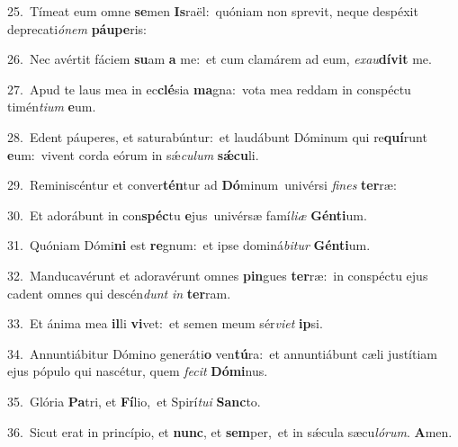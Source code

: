 {\numbfont\textcolor{\numbcolor}{25.}}~Tímeat eum omne \textbf{se}\-men \textbf{Is}\-raël:~\star quóniam non sprevit, neque despéxit deprecati\-\textit{ó}\-\textit{nem} \textbf{páu}\-\textbf{pe}ris:\par
{\numbfont\textcolor{\numbcolor}{26.}}~Nec avértit fáciem \textbf{su}\-am \textbf{a} me:~\star et cum clamárem ad eum, \textit{ex}\-\textit{au}\textbf{dí}\textbf{vit} me.\par
{\numbfont\textcolor{\numbcolor}{27.}}~Apud te laus mea in ec\-\textbf{clé}\-sia \textbf{ma}\-gna:~\star vota mea reddam in conspéctu timén\-\textit{ti}\-\textit{um} \textbf{e}\-um.\par
{\numbfont\textcolor{\numbcolor}{28.}}~Edent páuperes, et saturabúntur:~\dagger et laudábunt Dóminum qui re\-\textbf{quí}\-runt \textbf{e}\-um:~\star vivent corda eórum in sǽ\-\textit{cu}\-\textit{lum} \textbf{sǽ}\-\textbf{cu}li.\par
{\numbfont\textcolor{\numbcolor}{29.}}~Reminiscéntur et conver\-\textbf{tén}\-tur ad \textbf{Dó}\-minum~\star univérsi \textit{fi}\-\textit{nes} \textbf{ter}\-ræ:\par
{\numbfont\textcolor{\numbcolor}{30.}}~Et adorábunt in con\-\textbf{spéc}\-tu \textbf{e}\-jus~\star univérsæ famí\-\textit{li}\-\textit{æ} \textbf{Gén}\-\textbf{ti}um.\par
{\numbfont\textcolor{\numbcolor}{31.}}~Quóniam Dómi\textbf{ni} est \textbf{re}\-gnum:~\star et ipse dominá\-\textit{bi}\-\textit{tur} \textbf{Gén}\-\textbf{ti}um.\par
{\numbfont\textcolor{\numbcolor}{32.}}~Manducavérunt et adoravérunt omnes \textbf{pin}\-gues \textbf{ter}\-ræ:~\star in conspéctu ejus cadent omnes qui descén\textit{dunt} \textit{in} \textbf{ter}\-ram.\par
{\numbfont\textcolor{\numbcolor}{33.}}~Et ánima mea \textbf{il}\-li \textbf{vi}\-vet:~\star et semen meum sér\-\textit{vi}\-\textit{et} \textbf{ip}\-si.\par
{\numbfont\textcolor{\numbcolor}{34.}}~Annuntiábitur Dómino generáti\textbf{o} ven\-\textbf{tú}\-ra:~\star et annuntiábunt cæli justítiam ejus pópulo qui nascétur, quem \textit{fe}\-\textit{cit} \textbf{Dó}\-\textbf{mi}nus.\par
{\numbfont\textcolor{\numbcolor}{35.}}~Glória \textbf{Pa}\-tri, et \textbf{Fí}\-lio,~\star et Spirí\-\textit{tu}\-\textit{i} \textbf{Sanc}\-to.\par
{\numbfont\textcolor{\numbcolor}{36.}}~Sicut erat in princípio, et \textbf{nunc}\-, et \textbf{sem}\-per,~\star et in sǽcula sæcu\-\textit{ló}\-\textit{rum}. \textbf{A}\-men.\par
